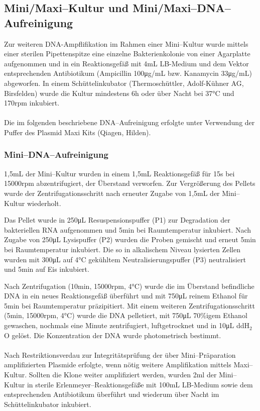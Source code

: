 \subsection{Mini/Maxi--Kultur und Mini/Maxi--DNA--Aufreinigung}
Zur weiteren DNA-Ampflifikation im Rahmen einer Mini--Kultur wurde mittels einer sterilen Pipettenspitze eine einzelne Bakterienkolonie von einer Agarplatte aufgenommen und in ein Reaktionsgefäß mit 4\si{\milli\liter} LB-Medium und dem Vektor entsprechenden Antibiotikum (Ampicillin 100\si{\micro\gram/\milli\liter} bzw. Kanamycin 33\si{\micro\gram/\milli\liter}) abgeworfen.
In einem Schüttelinkubator (Thermoschüttler, Adolf-Kühner AG, Birsfelden) wurde die Kultur mindestens 6\si{\hour} oder über Nacht bei 37\si{\celsius} und 170\si{rpm} inkubiert.
\\
\\
Die im folgenden beschriebene DNA--Aufreinigung erfolgte unter Verwendung der Puffer des Plasmid Maxi Kits (Qiagen, Hilden).

\subsubsection{Mini--DNA--Aufreinigung}
1,5\si{\milli\liter} der Mini--Kultur wurden in einem 1,5\si{\milli\liter} Reaktionsgefäß für 15\si{\second} bei 15000\si{rpm} abzentrifugiert, der Überstand verworfen. Zur Vergrößerung des Pellets wurde der Zentrifugationsschritt nach erneuter Zugabe von 1,5\si{\milli\liter} der Mini--Kultur wiederholt.

Das Pellet wurde in 250\si{\micro\liter} Resuspensionspuffer (P1) zur Degradation der bakteriellen RNA aufgenommen und 5\si{\minute} bei Raumtemperatur inkubiert. Nach Zugabe von 250\si{\micro\liter} Lysispuffer (P2) wurden die Proben gemischt und erneut 5\si{\minute} bei Raumtemperatur inkubiert. Die so in alkalischem Niveau lysierten Zellen wurden mit 300\si{\micro\liter} auf 4\si{\celsius} gekühltem Neutralisierungspuffer (P3) neutralisiert und 5\si{min} auf Eis inkubiert.

Nach Zentrifugation (10\si{\minute}, 15000\si{rpm}, 4\si{\celsius}) wurde die im Überstand befindliche DNA in ein neues Reaktionsgefäß überführt und mit 750\si{\micro\liter} reinem Ethanol für 5\si{\minute} bei Raumtemperatur präzipitiert. Mit einem weiteren Zentrifugationsschritt (5\si{\minute}, 15000\si{rpm}, 4\si{\celsius}) wurde die DNA pelletiert, mit 750\si{\micro\liter} 70\%igem Ethanol gewaschen, nochmals eine Minute zentrifugiert, luftgetrocknet und in 10\si{\micro\liter} ddH$_2$O gelöst.
Die Konzentration der DNA wurde photometrisch bestimmt.
\\
\\
Nach Restriktionsverdau zur Integritätsprüfung der über Mini--Präparation amplifizierten Plasmide erfolgte, wenn nötig weitere Amplifikation mittels Maxi--Kultur. Sollten die Klone weiter amplifiziert werden, wurden 2ml der Mini--Kultur in sterile Erlenmeyer--Reaktionsgefäße mit 100\si{\milli\liter} LB-Medium sowie dem entsprechenden Antibiotikum überführt und wiederum über Nacht im Schüttelinkubator inkubiert.

